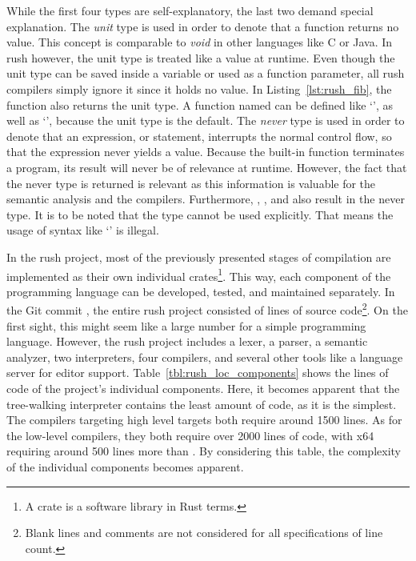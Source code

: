 While the first four types are self-explanatory, the last two demand special explanation.
The \emph{unit} type is used in order to denote that a function returns no value.
This concept is comparable to \emph{void} in other languages like C or Java.
In rush however, the unit type is treated like a value at runtime.
Even though the unit type can be saved inside a variable or used as a function parameter, all rush compilers simply ignore it since it holds no value.
In Listing~\ref{lst:rush_fib}, the  function also returns the unit type.
A function named  can be defined like `', as well as `', because the unit type is the default.
The \emph{never} type is used in order to denote that an expression, or statement, interrupts the normal control flow, so that the expression never yields a value.
Because the built-in  function terminates a program, its result will never be of relevance at runtime.
However, the fact that the never type is returned is relevant as this information is valuable for the semantic analysis and the compilers.
Furthermore, , , and  also result in the never type.
It is to be noted that the type cannot be used explicitly.
That means the usage of syntax like `' is illegal.

In the rush project, most of the previously presented stages of compilation are implemented as their own individual crates\footnote{A crate is a software library in Rust terms.}.
This way, each component of the programming language can be developed, tested, and maintained separately.
In the Git commit \rushCommit{}, the entire rush project consisted of
 lines of source code\footnote{Blank lines and comments are not considered for all specifications of line count.}.
On the first sight, this might seem like a large number for a simple programming language.
However, the rush project includes a lexer, a parser, a semantic analyzer, two interpreters, four compilers, and several other tools like a language server for editor support.
Table~\ref{tbl:rush_loc_components} shows the lines of code of the project's individual components.
Here, it becomes apparent that the tree-walking interpreter contains the least amount of code, as it is the simplest.
The compilers targeting high level targets both require around 1500 lines.
As for the low-level compilers, they both require over 2000 lines of code, with x64 requiring around 500 lines more than \riscv{}.
By considering this table, the complexity of the individual components becomes apparent.
